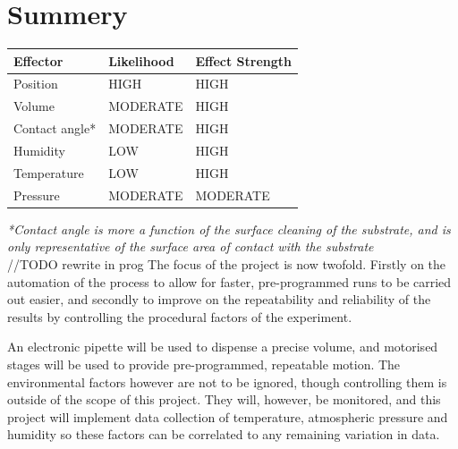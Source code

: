\section{Summery}
\begin{table}[h]
    \centering
    \begin{tabular}{|l|l|l|}
        \hline
        \textbf{Effector} & \textbf{Likelihood} & \textbf{Effect Strength} \\ \hline
        Position          & HIGH                & HIGH                     \\ \hline
        Volume            & MODERATE            & HIGH                     \\ \hline
        Contact angle*    & MODERATE            & HIGH                     \\ \hline
        Humidity          & LOW                 & HIGH                     \\ \hline
        Temperature       & LOW                 & HIGH                     \\ \hline
        Pressure          & MODERATE            & MODERATE                 \\ \hline
    \end{tabular}
\end{table}
\textit{\small{*Contact angle is more a function of the surface cleaning of the substrate, and is only representative of the surface area of contact with the substrate}} \\

//TODO rewrite in prog
The focus of the project is now twofold. Firstly on the automation of the process to allow for faster, pre-programmed runs to be carried out easier, and secondly to improve on the repeatability and reliability of the results by controlling the procedural factors of the experiment.

An electronic pipette will be used to dispense a precise volume, and motorised stages will be used to provide pre-programmed, repeatable motion. The environmental factors however are not to be ignored, though controlling them is outside of the scope of this project. They will, however, be monitored, and this project will implement data collection of temperature, atmospheric pressure and humidity so these factors can be correlated to any remaining variation in data.